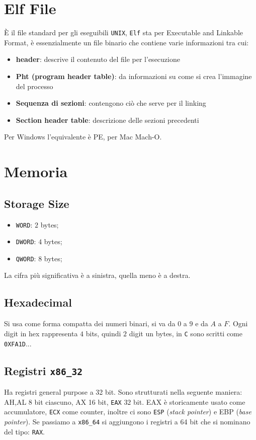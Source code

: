 \section{Elf File}
È il file standard per gli eseguibili \texttt{UNIX}, \texttt{Elf} sta per
Executable and Linkable Format, è essenzialmente un file binario che
contiene varie informazioni tra cui:
\begin{itemize}
	\item \textbf{header}: descrive il contenuto del file per l'esecuzione
	\item \textbf{Pht (program header table)}: da informazioni su come si crea
    l'immagine del processo
	\item \textbf{Sequenza di sezioni}: contengono ciò che serve per il linking
	\item \textbf{Section header table}: descrizione delle sezioni precedenti 
\end{itemize}
Per Windows l'equivalente è PE, per Mac Mach-O.
\section{Memoria}
\subsection{Storage Size}
\begin{itemize}
    \item \texttt{WORD}: $2$ bytes;
    \item \texttt{DWORD}: $4$ bytes;
    \item \texttt{QWORD}: $8$ bytes;
\end{itemize}
La cifra più significativa è a sinistra, quella meno è a destra.
\subsection{Hexadecimal}
Si usa come forma compatta dei numeri binari, si va da $0$ a $9$ e da $A$ a $F$.
Ogni digit in hex rappresenta $4$ bits, quindi $2$ digit un bytes,
in \texttt{C} sono scritti come \texttt{0XFA1D}...

\subsection{Registri \texttt{x86\_32}}
Ha registri general purpose a 32 bit. Sono strutturati
nella seguente maniera: AH,AL 8 bit ciascuno, AX 16 bit,
\texttt{EAX} $32$ bit. EAX è storicamente usato come accumulatore,
\texttt{ECX} come counter, inoltre ci sono \texttt{ESP} (\textit{stack pointer}) e
EBP (\textit{base pointer}). Se passiamo a \texttt{x86\_64} 
si aggiungono i
registri a 64 bit che si nominano del tipo: \texttt{RAX}.

